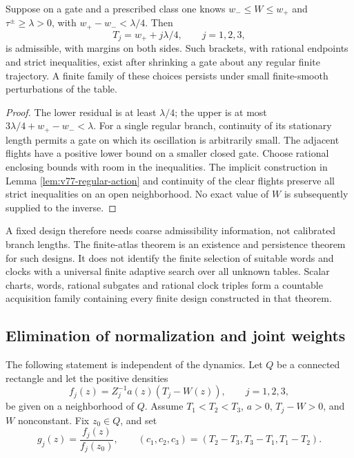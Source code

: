 \begin{lemma}
\label{lem:v77-clock-design}
Suppose on a gate and a prescribed class one knows
$w_-\le W\le w_+$ and $\tau^\pm\ge\lambda>0$, with
$w_+-w_-<\lambda/4$.  Then
\[
 T_j=w_++j\lambda/4,\qquad j=1,2,3,
\]
is admissible, with margins on both sides.  Such brackets, with rational
endpoints and strict inequalities, exist after shrinking a gate about
any regular finite trajectory.  A finite family of these choices
persists under small finite-smooth perturbations of the table.
\end{lemma}
\begin{proof}
The lower residual is at least $\lambda/4$; the upper is at most
$3\lambda/4+w_+-w_-<\lambda$.  For a single regular branch, continuity
of its stationary length permits a gate on which its oscillation is
arbitrarily small.  The adjacent flights have a positive lower bound
on a smaller closed gate.  Choose rational enclosing bounds with room
in the inequalities.  The implicit construction in Lemma
\ref{lem:v77-regular-action} and continuity of the clear flights preserve
all strict inequalities on an open neighborhood.  No exact value of
$W$ is subsequently supplied to the inverse.
\end{proof}

A fixed design therefore needs coarse admissibility information, not
calibrated branch lengths.  The finite-atlas theorem is an existence and
persistence theorem for such designs.  It does not identify the finite
selection of suitable words and clocks with a universal finite adaptive
search over all unknown tables.  Scalar charts, words, rational subgates
and rational clock triples form a countable acquisition family containing
every finite design constructed in that theorem.

\subsection{Elimination of normalization and joint weights}

The following statement is independent of the dynamics.  Let $Q$ be a
connected rectangle and let the positive densities
\[
 f_j(z)=Z_j^{-1}a(z)(T_j-W(z)),\qquad j=1,2,3,
\]
be given on a neighborhood of $Q$.  Assume $T_1<T_2<T_3$, $a>0$,
$T_j-W>0$, and $W$ nonconstant.  Fix $z_0\in Q$, and set
\begin{equation}\label{eq:v77-normalized-slices}
 g_j(z)=\frac{f_j(z)}{f_j(z_0)},\qquad
 (c_1,c_2,c_3)=(T_2-T_3,T_3-T_1,T_1-T_2).
\end{equation}

